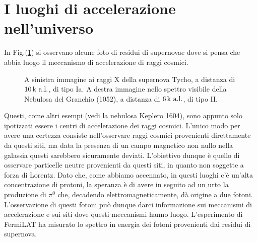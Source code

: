 \section{I luoghi di accelerazione nell'universo}
In Fig.(\ref{img:snr}) si osservano alcune foto di residui di supernovae dove si pensa che abbia luogo il meccanismo di accelerazione di raggi cosmici.
\begin{figure}[H]
    \centering
    \quad
    \caption{A sinistra immagine ai raggi X della supernova Tycho, a distanza di $10\,\textup{k a.l.}$, di tipo Ia. A destra immagine nello spettro visibile della Nebulosa del Granchio (1052), a distanza di $6\,\textup{k a.l.}$, di tipo II.}%
    \label{img:snr}    
\end{figure}
Questi, come altri esempi (vedi la nebulosa Keplero 1604), sono appunto solo ipotizzati essere i centri di accelerazione dei raggi cosmici. L'unico modo per avere una certezza consiste nell'osservare raggi cosmici provenienti direttamente da questi siti, ma data la presenza di un campo magnetico non nullo nella galassia questi sarebbero sicuramente deviati. L'obiettivo dunque è quello di osservare particelle neutre provenienti da questi siti, in quanto non soggette a forza di Lorentz. Dato che, come abbiamo accennato, in questi luoghi c'è un'alta concentrazione di protoni, la speranza è di avere in seguito ad un urto la produzione di $\pi^0$ che, decadendo elettromagneticamente, dà origine a due fotoni. L'osservazione di questi fotoni può dunque darci informazione sui meccanismi di accelerazione e sui siti dove questi meccanismi hanno luogo. L'esperimento di FermiLAT ha misurato lo spettro in energia dei fotoni provenienti dai residui di supernova.
